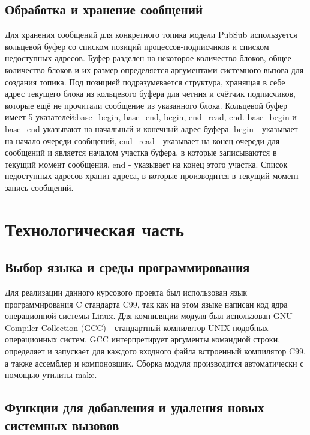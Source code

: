 \documentclass{bmstu}
\begin{document}
\section{Обработка и хранение сообщений}
Для хранения сообщений для конкретного топика модели PubSub используется кольцевой буфер со списком позиций процессов-подписчиков и списком недоступных адресов. Буфер разделен на некоторое количество блоков, общее количество блоков и их размер определяется аргументами системного вызова для создания топика. Под позицией подразумевается структура, хранящая в себе адрес текущего блока из кольцевого буфера для четния и счётчик подписчиков, которые ещё не прочитали сообщение из указанного блока.
Кольцевой буфер имеет 5 указателей:base\_begin, base\_end, begin, end\_read, end. base\_begin и base\_end указывают на начальный и конечный адрес буфера. begin - указывает на начало очереди сообщений, end\_read - указывает на конец очереди для сообщений и является началом участка буфера, в которые записываются в текущий момент сообщения, end - указывает на конец этого участка. Список недоступных адресов хранит адреса, в которые производится в текущий момент запись сообщений. 


\chapter{Технологическая часть}
\section{Выбор языка и среды программирования}
Для реализации данного курсового проекта был использован язык программирования C стандарта C99, так как на этом языке написан код ядра операционной системы Linux. Для компиляции модуля был использован GNU Compiler Collection (GCC) - стандартный компилятор UNIX-подобных операционных систем. GCC интерпретирует аргументы командной строки, определяет и запускает для каждого входного файла встроенный компилятор C99, а также ассемблер и компоновщик.
Сборка модуля производится автоматически с помощью утилиты make.

\section{Функции для добавления и удаления новых системных вызовов}%
\end{document}
